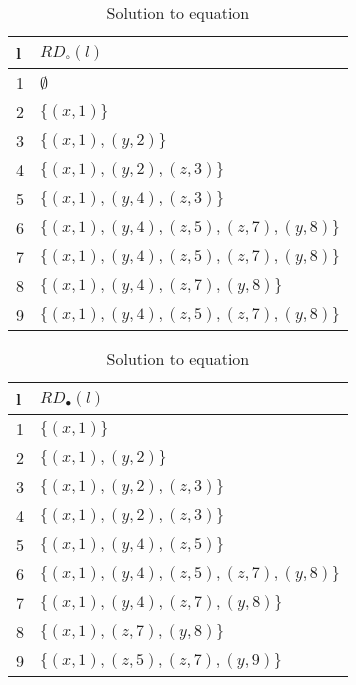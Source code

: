 \begin{table}[H]
	\begin{tabular}{| l | l |}
	  \hline
	  l & $RD_\circ(l)$ \\
	  \hline
	  \hline
	1 & $\emptyset$\\
	2 & $\{(x,1)\}$\\
	3 & $\{(x,1),(y,2)\}$\\
	4 & $\{(x,1),(y,2),(z,3)\}$\\
	5 & $\{(x,1),(y,4),(z,3)\}$\\
	6 & $\{(x,1),(y,4),(z,5),(z,7),(y,8)\}$\\
	7 & $\{(x,1),(y,4),(z,5),(z,7),(y,8)\}$\\
	8 & $\{(x,1),(y,4),(z,7),(y,8)\}$\\
	9 & $\{(x,1),(y,4),(z,5),(z,7),(y,8)\}$\\
	  \hline
	\end{tabular}
    \centering
    \caption{Solution to equation}
    \label{table:solution1}
\end{table}

\begin{table}[H]
	\begin{tabular}{| l | l |}
	  \hline
	  l & $RD_\bullet(l)$ \\
	  \hline
	  \hline
	1 & $\{(x,1)\}$\\
	2 & $\{(x,1),(y,2)\}$\\
	3 & $\{(x,1),(y,2),(z,3)\}$\\
	4 & $\{(x,1),(y,2),(z,3)\}$\\
	5 & $\{(x,1),(y,4),(z,5)\}$\\
	6 & $\{(x,1),(y,4),(z,5),(z,7),(y,8)\}$\\
	7 & $\{(x,1),(y,4),(z,7),(y,8)\}$\\
	8 & $\{(x,1),(z,7),(y,8)\}$\\
	9 & $\{(x,1),(z,5),(z,7),(y,9)\}$\\
	  \hline
	\end{tabular}
    \centering
	\caption{Solution to equation}
	\label{table:solution2}
\end{table}

